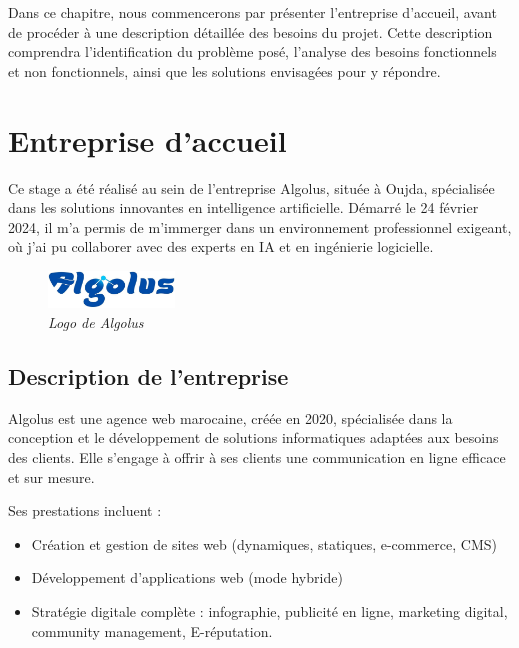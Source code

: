 \documentclass[12pt,a4paper]{report}
\begin{document}
	Dans ce chapitre, nous commencerons par présenter l’entreprise d’accueil, avant de procéder à une description détaillée des besoins du projet. Cette description comprendra l’identification du problème posé, l’analyse des besoins fonctionnels et non fonctionnels, ainsi que les solutions envisagées pour y répondre.
	
	\section{Entreprise d’accueil}
	
	Ce stage a été réalisé au sein de l’entreprise Algolus, située à Oujda, spécialisée dans les solutions innovantes en intelligence artificielle. Démarré le 24 février 2024, il m’a permis de m’immerger dans un environnement professionnel exigeant, où j’ai pu collaborer avec des experts en IA et en ingénierie logicielle.
	
	\begin{figure}[H]
		\centering
		\includegraphics[width=0.3\textwidth]{algolus-logo.png}
		\caption{\textit{Logo de Algolus}}
		\label{fig:algolus-logo}
	\end{figure}
	
	\subsection{Description de l’entreprise}
	
	Algolus est une agence web marocaine, créée en 2020, spécialisée dans la conception et le développement de solutions informatiques adaptées aux besoins des clients. Elle s'engage à offrir à ses clients une communication en ligne efficace et sur mesure.
	
	Ses prestations incluent :
	
	\renewcommand{\labelitemi}{$\bullet$}
	\begin{itemize}
		\item Création et gestion de sites web (dynamiques, statiques, e-commerce, CMS)
		\item Développement d'applications web (mode hybride)
		\item Stratégie digitale complète : infographie, publicité en ligne, marketing digital, community management, E-réputation.
	\end{itemize}
	
\end{document}

